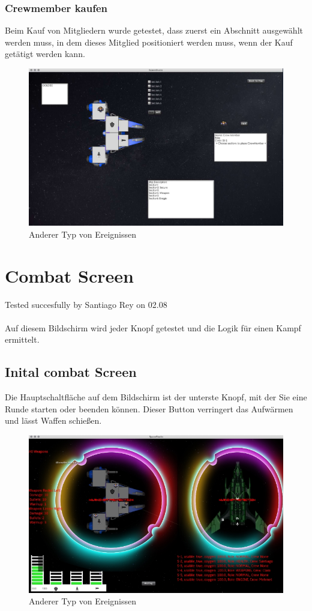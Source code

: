 \documentclass[12pt]{article}
\begin{document}
\subsubsection{Crewmember kaufen}
Beim Kauf von Mitgliedern wurde getestet, dass zuerst ein Abschnitt ausgewählt werden muss, in dem dieses Mitglied positioniert werden muss, wenn der Kauf getätigt werden kann.
\begin{figure}[htp]
\centering
\includegraphics[scale=0.4]{TestProtocolBilder/crewmemberkaufen.jpg}
\caption{Anderer Typ von Ereignissen}
\end{figure}


\newpage
\section{Combat Screen}
Tested succesfully by Santiago Rey on 02.08\\\\
Auf diesem Bildschirm wird jeder Knopf getestet und die Logik für einen Kampf ermittelt.

\subsection{Inital combat Screen}
Die Hauptschaltfläche auf dem Bildschirm ist der unterste Knopf, mit der Sie eine Runde starten oder beenden können. Dieser Button verringert das Aufwärmen und lässt Waffen schießen.
\begin{figure}[htp]
\centering
\includegraphics[scale=0.7]{TestProtocolBilder/OptimizedinitialBattelScreen.png}
\caption{Anderer Typ von Ereignissen}
\end{figure}
\end{document}
